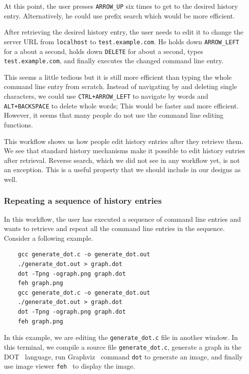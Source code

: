 \documentclass[thesis=M,english]{FITthesis}[2012/10/20]
\let\myCite\cite
\renewcommand\cite{\unskip~\myCite}
\begin{document}
At this point, the user presses \verb|ARROW_UP| six times to get to the desired history entry. Alternatively, he could use prefix search which would be more efficient.

After retrieving the desired history entry, the user needs to edit it to change the server URL from \verb|localhost| to \verb|test.example.com|. He holds down \verb|ARROW_LEFT| for a about a second, holds down \verb|DELETE| for about a second, types \verb|test.example.com|, and finally executes the changed command line entry. 

This seems a little tedious but it is still more efficient than typing the whole command line entry from scratch. Instead of navigating by and deleting single characters, we could use \verb|CTRL+ARROW_LEFT| to navigate by words and \verb|ALT+BACKSPACE| to delete whole words; This would be faster and more efficient. However, it seems that many people do not use the command line editing functions.

This workflow shows us how people edit history entries after they retrieve them. We see that standard history mechanisms make it possible to edit history entries after retrieval. Reverse search, which we did not see in any workflow yet, is not an exception. This is a useful property that we should include in our designs as well. 

\subsubsection*{Repeating a sequence of history entries}

In this workflow, the user has executed a sequence of command line entries and wants to retrieve and repeat all the command line entries in the sequence. 
Consider a following example.

\begin{verbatim}
    gcc generate_dot.c -o generate_dot.out
    ./generate_dot.out > graph.dot
    dot -Tpng -ograph.png graph.dot
    feh graph.png
    gcc generate_dot.c -o generate_dot.out
    ./generate_dot.out > graph.dot
    dot -Tpng -ograph.png graph.dot
    feh graph.png
\end{verbatim}

In this example, we are editing the \verb|generate_dot.c| file in another window. In this terminal, we compile a source file \verb|generate_dot.c|, generate a graph in the DOT\cite{graphvizthedotlanguage} language, run Graphviz\cite{ellson2001graphviz} command \verb|dot| to generate an image, and finally use image viewer \verb|feh|\cite{toolsfeh} to display the image.
\end{document}
